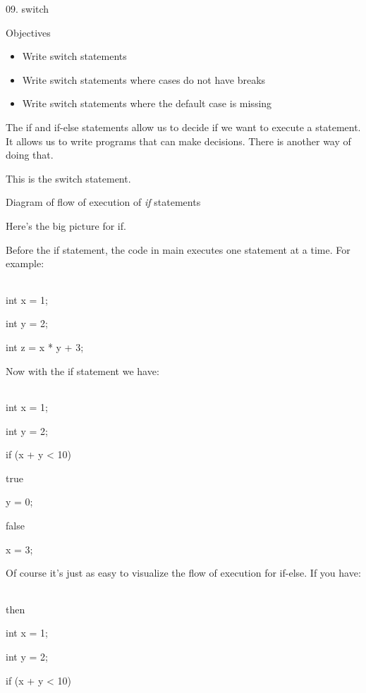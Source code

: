 \documentclass[
]{article}
\author{}
\date{}
\providecommand{\tightlist}{%
  \setlength{\itemsep}{0pt}\setlength{\parskip}{0pt}}
\begin{document}
09. switch

Objectives

\begin{itemize}
\tightlist
\item
  Write switch statements
\item
  Write switch statements where cases do not have breaks
\item
  Write switch statements where the default case is missing
\end{itemize}

The if and if-else statements allow us to decide if we want to execute a
statement. It allows us to write programs that can make decisions. There
is another way of doing that.

This is the switch statement.

Diagram of flow of execution of\emph{ if} statements

Here's the big picture for if.

Before the if statement, the code in main executes one statement at a
time. For example:

\begin{longtable}[]{@{}@{}}
\toprule
\endhead
\bottomrule
\end{longtable}

int x = 1;

int y = 2;

int z = x * y + 3;

Now with the if statement we have:

\begin{longtable}[]{@{}@{}}
\toprule
\endhead
\bottomrule
\end{longtable}

int x = 1;

int y = 2;

if (x + y \textless{} 10)

true

y = 0;

false

x = 3;

Of course it's just as easy to visualize the flow of execution for
if-else. If you have:

\begin{longtable}[]{@{}@{}}
\toprule
\endhead
\bottomrule
\end{longtable}

then

int x = 1;

int y = 2;

if (x + y \textless{} 10)
\end{document}
